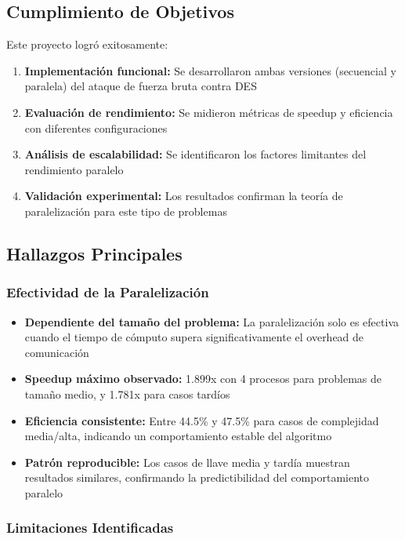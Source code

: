 \documentclass[12pt,letterpaper]{article}
\begin{document}
\subsection{Cumplimiento de Objetivos}

Este proyecto logró exitosamente:

\begin{enumerate}
    \item \textbf{Implementación funcional:} Se desarrollaron ambas versiones (secuencial y paralela) del ataque de fuerza bruta contra DES
    \item \textbf{Evaluación de rendimiento:} Se midieron métricas de speedup y eficiencia con diferentes configuraciones
    \item \textbf{Análisis de escalabilidad:} Se identificaron los factores limitantes del rendimiento paralelo
    \item \textbf{Validación experimental:} Los resultados confirman la teoría de paralelización para este tipo de problemas
\end{enumerate}

\subsection{Hallazgos Principales}

\subsubsection{Efectividad de la Paralelización}

\begin{itemize}
    \item \textbf{Dependiente del tamaño del problema:} La paralelización solo es efectiva cuando el tiempo de cómputo supera significativamente el overhead de comunicación
    \item \textbf{Speedup máximo observado:} 1.899x con 4 procesos para problemas de tamaño medio, y 1.781x para casos tardíos
    \item \textbf{Eficiencia consistente:} Entre 44.5\% y 47.5\% para casos de complejidad media/alta, indicando un comportamiento estable del algoritmo
    \item \textbf{Patrón reproducible:} Los casos de llave media y tardía muestran resultados similares, confirmando la predictibilidad del comportamiento paralelo
\end{itemize}

\subsubsection{Limitaciones Identificadas}
\end{document}
